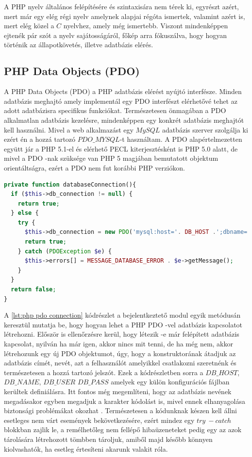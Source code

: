 \documentclass[12pt]{report}
\theoremstyle{definition}
\begin{document}
	A PHP nyelv általános felépítésére és szintaxisára nem térek ki, egyrészt azért, mert már egy elég régi nyelv amelynek alapjai régóta ismertek, valamint azért is, mert elég közel a $C$ nyelvhez, amely még ismertebb. Viszont mindenképpen ejtenék pár szót a nyelv sajátosságáról, főkép arra fókuszálva, hogy hogyan történik az állapotkövetés, illetve adatbázis elérés.
	
	\subsection{PHP Data Objects (PDO)}
	A PHP Data Objects (PDO) a PHP adatbázis elérést nyújtó interfésze. Minden adatbázis meghajtó amely implementál egy PDO interfészt elérhetővé tehet az adott adatbázisra specifikus funkciókat. Természetesen önmagában a PDO alkalmatlan adatbázis kezelésre, mindenképpen egy konkrét adatbázis meghajtót kell használni. Mivel a web alkalmazást egy $MySQL$ adatbázis szerver szolgálja ki ezért én a hozzá tartozó $PDO\_MYSQL$-t használtam. A PDO alapértelmezetten együtt jár a PHP 5.1-el és elérhető PECL kiterjesztésként is PHP 5.0 alatt, de mivel a PDO -nak szüksége van PHP 5 magjában bemutatott objektum orientáltságra, ezért a PDO nem fut korábbi PHP verziókon. 
	
	\noindent\begin{minipage}{\linewidth}
		\begin{lstlisting}[language=php,label={lst:php pdo connection}, caption={PHP PDO Connector használata}]
private function databaseConnection(){
  if ($this->db_connection != null) {
    return true;
  } else {
    try {
      $this->db_connection = new PDO('mysql:host='. DB_HOST .';dbname='. DB_NAME . ';charset=utf8', DB_USER, DB_PASS);
      return true;
    } catch (PDOException $e) {
      $this->errors[] = MESSAGE_DATABASE_ERROR . $e->getMessage();
    }
  }
  return false;
}
		\end{lstlisting}
	\end{minipage}
	
	A \ref{lst:php pdo connection} kódrészlet a bejelentkeztető modul egyik metódusán keresztül mutatja be, hogy hogyan lehet a PHP PDO -vel adatbázis kapcsolatot létrehozni. Először is ellenőrzésre kerül, hogy létezik -e már felépített adatbázis kapcsolat, nyilván ha már igen, akkor nincs mit tenni, de ha még nem, akkor létrehozunk egy új PDO objektumot, úgy, hogy a konstruktorának átadjuk az adatbázis címét, nevét, azt a felhasználót amelyikkel csatlakozni szeretnénk és természetesen a hozzá tartozó jelszót. Ezek a kódrészletben sorra a $DB\_HOST$, $DB\_NAME$, $DB\_USER$ $DB\_PASS$ amelyek egy külön konfigurációs fájlban kerültek definiálásra. Itt fontos még megemlíteni, hogy az adatbázis nevének megadásakor egyben megadjuk a karakter kódolást is, mivel ennek elhanyagolása biztonsági problémákat okozhat \cite{PDO-charset-security}. Természetesen a kódunknak készen kell állni esetleges nem várt események bekövetkezésére, ezért mindez egy $try\ - catch$ blokkban zajlik le, a remélhetőleg nem fellépő hibaüzeneteket pedig egy az azok tárolására létrehozott tömbben tároljuk, amiből majd később könnyen kiolvashatók, ha esetleg értesíteni akarunk valakit róla.
	
\end{document}
